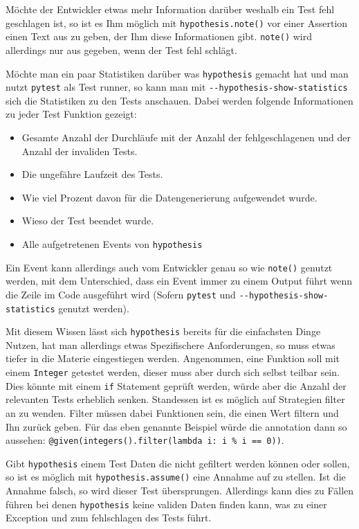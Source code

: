 Möchte der Entwickler etwas mehr Information darüber weshalb ein Test fehl geschlagen
ist, so ist es Ihm möglich mit \lstinline{hypothesis.note()} vor einer Assertion
einen Text aus zu geben, der Ihm diese Informationen gibt. \lstinline{note()} wird
allerdings nur aus gegeben, wenn der Test fehl schlägt.

Möchte man ein paar Statistiken darüber was \lstinline{hypothesis} gemacht hat und man
nutzt \lstinline{pytest} als Test runner, so kann man mit \lstinline{--hypothesis-show-statistics}
sich die Statistiken zu den Tests anschauen. Dabei werden folgende Informationen 
zu jeder Test Funktion gezeigt:
\begin{itemize}
    \item Gesamte Anzahl der Durchläufe mit der Anzahl der fehlgeschlagenen und der Anzahl der invaliden Tests.
    \item Die ungefähre Laufzeit des Tests.
    \item Wie viel Prozent davon für die Datengenerierung aufgewendet wurde.
    \item Wieso der Test beendet wurde.
    \item Alle aufgetretenen Events von \lstinline{hypothesis}
\end{itemize}

Ein Event kann allerdings auch vom Entwickler genau so wie \lstinline{note()} genutzt
werden, mit dem Unterschied, dass ein Event immer zu einem Output führt wenn die
Zeile im Code ausgeführt wird (Sofern \lstinline{pytest} und
\lstinline{--hypothesis-show-statistics} genutzt werden).

Mit diesem Wissen lässt sich \lstinline{hypothesis} bereits für die einfachsten Dinge
Nutzen, hat man allerdings etwas Spezifischere Anforderungen, so muss etwas tiefer
in die Materie eingestiegen werden. Angenommen, eine Funktion soll mit einem
\lstinline{Integer} getestet werden, dieser muss aber durch sich selbst teilbar sein.
Dies könnte mit einem \lstinline{if} Statement geprüft werden, würde aber die Anzahl
der relevanten Tests erheblich senken. Standessen ist es möglich auf Strategien filter
an zu wenden. Filter müssen dabei Funktionen sein, die einen Wert filtern und Ihn zurück
geben. Für das eben genannte Beispiel würde die \Gls{annotation} dann so aussehen:
\lstinline{@given(integers().filter(lambda i: i % i == 0))}.

Gibt \lstinline{hypothesis} einem Test Daten die nicht gefiltert werden können oder sollen,
so ist es möglich mit \lstinline{hypothesis.assume()} eine Annahme auf zu stellen. Ist die
Annahme falsch, so wird dieser Test übersprungen. Allerdings kann dies zu Fällen führen bei
denen \lstinline{hypothesis} keine validen Daten finden kann, was zu einer Exception und
zum fehlschlagen des Tests führt.

